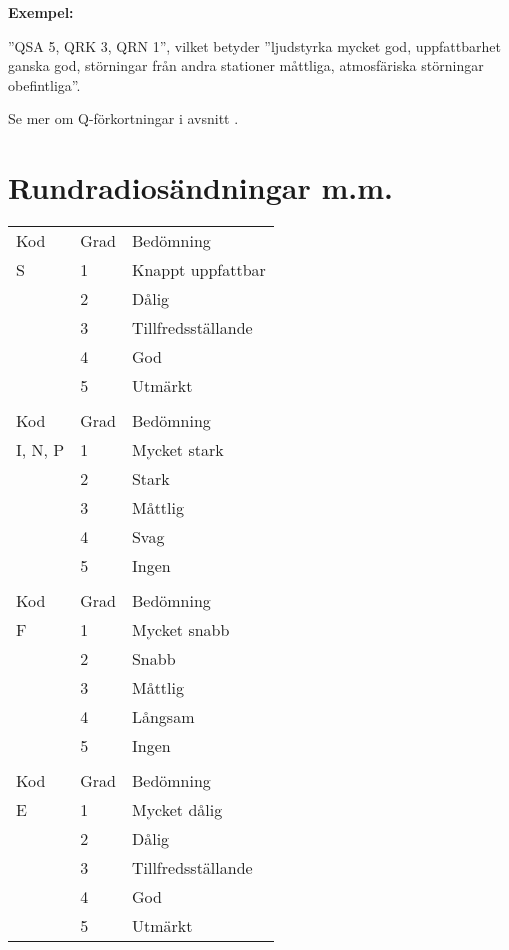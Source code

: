 \textbf{Exempel:}

''QSA 5, QRK 3, QRN 1'', vilket betyder
''ljudstyrka mycket god, uppfattbarhet ganska god, störningar från andra
stationer måttliga, atmosfäriska störningar obefintliga''.

Se mer om Q-förkortningar i avsnitt .

\section{Rundradiosändningar m.m.}
\label{sinpo}

\begin{table}[ht]
  \begin{center}
\begin{tabular}{lll}
  Kod & Grad & Bedömning \\
  S   & 1    & Knappt uppfattbar \\
      & 2    & Dålig \\
      & 3    & Tillfredsställande \\
      & 4    & God \\
      & 5    & Utmärkt \\
  & & \\

  Kod     & Grad & Bedömning \\
  I, N, P & 1    & Mycket stark \\
          & 2    & Stark \\
          & 3    & Måttlig \\
          & 4    & Svag \\
          & 5    & Ingen \\
  & & \\

  Kod & Grad & Bedömning \\
  F   & 1    & Mycket snabb \\
      & 2    & Snabb \\
      & 3    & Måttlig \\
      & 4    & Långsam \\
      & 5    & Ingen \\

  & & \\
  Kod & Grad & Bedömning \\
  E   & 1    & Mycket dålig \\
      & 2    & Dålig \\
      & 3    & Tillfredsställande \\
      & 4    & God \\
      & 5    & Utmärkt \\


\end{tabular}
\end{center}
\end{table}
